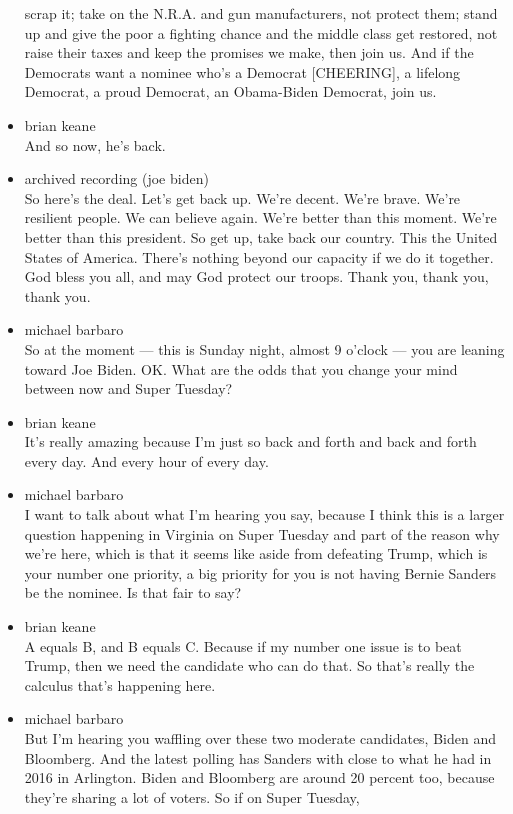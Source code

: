 \begin{itemize}
  scrap it; take on the N.R.A. and gun manufacturers, not protect them;
  stand up and give the poor a fighting chance and the middle class get
  restored, not raise their taxes and keep the promises we make, then
  join us. And if the Democrats want a nominee who's a Democrat
  {[}CHEERING{]}, a lifelong Democrat, a proud Democrat, an Obama-Biden
  Democrat, join us.
\item
  brian keane\\
  And so now, he's back.
\item
  archived recording (joe biden)\\
  So here's the deal. Let's get back up. We're decent. We're brave.
  We're resilient people. We can believe again. We're better than this
  moment. We're better than this president. So get up, take back our
  country. This the United States of America. There's nothing beyond our
  capacity if we do it together. God bless you all, and may God protect
  our troops. Thank you, thank you, thank you.
\item
  michael barbaro\\
  So at the moment --- this is Sunday night, almost 9 o'clock --- you
  are leaning toward Joe Biden. OK. What are the odds that you change
  your mind between now and Super Tuesday?
\item
  brian keane\\
  It's really amazing because I'm just so back and forth and back and
  forth every day. And every hour of every day.
\item
  michael barbaro\\
  I want to talk about what I'm hearing you say, because I think this is
  a larger question happening in Virginia on Super Tuesday and part of
  the reason why we're here, which is that it seems like aside from
  defeating Trump, which is your number one priority, a big priority for
  you is not having Bernie Sanders be the nominee. Is that fair to say?
\item
  brian keane\\
  A equals B, and B equals C. Because if my number one issue is to beat
  Trump, then we need the candidate who can do that. So that's really
  the calculus that's happening here.
\item
  michael barbaro\\
  But I'm hearing you waffling over these two moderate candidates, Biden
  and Bloomberg. And the latest polling has Sanders with close to what
  he had in 2016 in Arlington. Biden and Bloomberg are around 20 percent
  too, because they're sharing a lot of voters. So if on Super Tuesday,

\end{itemize}
